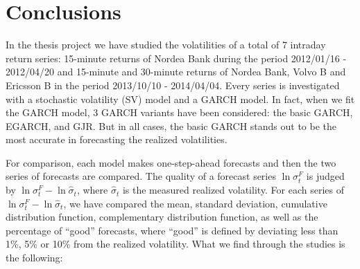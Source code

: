 \chapter{Conclusions}
\label{chp:summary2}
In the thesis project we have studied the volatilities of a total of 7
intraday return series: 15-minute returns of Nordea Bank during the
period 2012/01/16 - 2012/04/20 and 15-minute and 30-minute returns of
Nordea Bank, Volvo B and Ericsson B in the period 2013/10/10 -
2014/04/04. Every series is investigated with a stochastic volatility
(SV) model and a GARCH model. In fact, when we fit the GARCH model, 3
GARCH variants have been considered: the basic GARCH, EGARCH, and
GJR. But in all cases, the basic GARCH stands out to be the most
accurate in forecasting the realized volatilities.

For comparison, each model makes one-step-ahead forecasts and
then the two series of forecasts are compared. The quality of a
forecast series $\ln\sigma^F_t$ is judged by $\ln\sigma^F_t - \ln
\hat{\sigma}_t$, where $\hat{\sigma}_t$ is the measured realized
volatility. For each series of $\ln\sigma^F_t - \ln \hat{\sigma}_t$, we
have compared the mean, standard deviation, cumulative distribution
function, complementary distribution function, as well as the
percentage of ``good'' forecasts, where ``good'' is defined by
deviating less than 1\%, 5\% or 10\% from the realized
volatility. What we find through the studies is the following:
